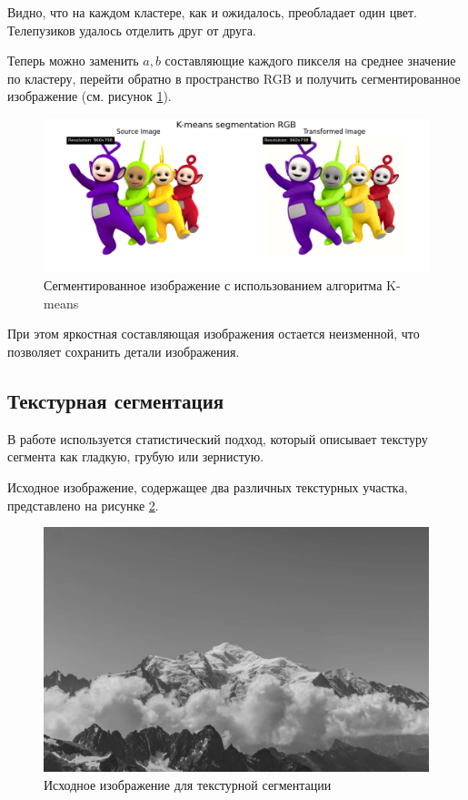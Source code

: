 \FloatBarrier
Видно, что на каждом кластере, как и ожидалось, преобладает один цвет. Телепузиков удалось отделить друг от друга. 

Теперь можно заменить $a, b$ составляющие каждого пикселя на среднее значение по кластеру, перейти обратно в пространство RGB и получить сегментированное изображение (см. рисунок \ref{img:kmeans_segmentation_RGB}).

\begin{figure}[ht!]
    \centering
    \includegraphics[width=\textwidth]{../results/K-means segmentation RGB.png}
    \caption{Сегментированное изображение с использованием алгоритма K-means}
    \label{img:kmeans_segmentation_RGB}
\end{figure}
При этом яркостная составляющая изображения остается неизменной, что позволяет сохранить детали изображения.

\FloatBarrier
\subsection{Текстурная сегментация}

В работе используется статистический подход, который описывает текстуру сегмента 
как гладкую, грубую или зернистую. 

Исходное изображение, содержащее два различных текстурных участка, представлено на рисунке \ref{img:texture_source}.

\begin{figure}[ht!]
    \centering
    \includegraphics[width=\textwidth]{../mountain.jpeg}
    \caption{Исходное изображение для текстурной сегментации}
    \label{img:texture_source}
\end{figure}

